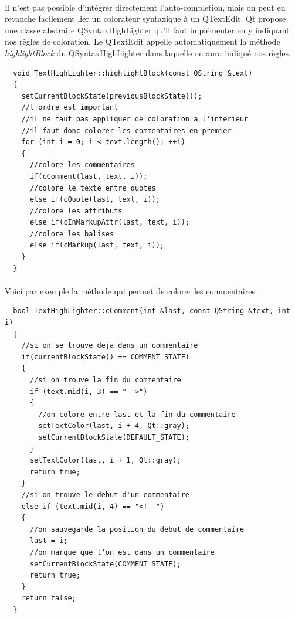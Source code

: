 \paragraph{}
Il n'est pas possible d'intégrer directement l'auto-completion, mais on peut en revanche facilement lier un colorateur syntaxique à un QTextEdit. Qt propose une classe abstraite QSyntaxHighLighter qu'il faut implémenter en y indiquant nos règles de coloration. Le QTextEdit appelle automatiquement la méthode \textit{highlightBlock} du QSyntaxHighLighter dans laquelle on aura indiqué nos règles.

\begin{lstlisting}
  void TextHighLighter::highlightBlock(const QString &text)
  {
    setCurrentBlockState(previousBlockState());
    //l'ordre est important
    //il ne faut pas appliquer de coloration a l'interieur
    //il faut donc colorer les commentaires en premier
    for (int i = 0; i < text.length(); ++i)
    {
      //colore les commentaires
      if(cComment(last, text, i));
      //colore le texte entre quotes
      else if(cQuote(last, text, i));
      //colore les attributs
      else if(cInMarkupAttr(last, text, i));
      //colore les balises
      else if(cMarkup(last, text, i));
    }
  }
\end{lstlisting}
\paragraph{}
Voici par exemple la méthode qui permet de colorer les commentaires :
\begin{lstlisting}
  bool TextHighLighter::cComment(int &last, const QString &text, int i)
  {
    //si on se trouve deja dans un commentaire
    if(currentBlockState() == COMMENT_STATE)
    {
      //si on trouve la fin du commentaire
      if (text.mid(i, 3) == "-->")
      {
        //on colore entre last et la fin du commentaire
        setTextColor(last, i + 4, Qt::gray);
        setCurrentBlockState(DEFAULT_STATE);
      }
      setTextColor(last, i + 1, Qt::gray);
      return true;
    }
    //si on trouve le debut d'un commentaire
    else if (text.mid(i, 4) == "<!--")
    {
      //on sauvegarde la position du debut de commentaire
      last = i;
      //on marque que l'on est dans un commentaire
      setCurrentBlockState(COMMENT_STATE);
      return true;
    }
    return false;
  }
\end{lstlisting}
\paragraph{}
